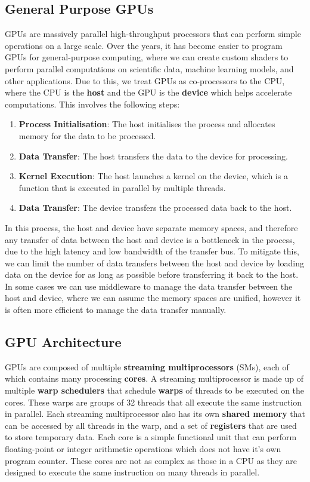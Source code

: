 \documentclass{article}
\begin{document}
\subsection{General Purpose GPUs}
GPUs are massively parallel high-throughput processors that can perform
simple operations on a large scale. Over the years, it has become
easier to program GPUs for general-purpose computing, where we can
create custom shaders to perform parallel computations on scientific
data, machine learning models, and other applications. Due to this, we
treat GPUs as co-processors to the CPU, where the CPU is the
\textbf{host} and the GPU is the \textbf{device} which helps accelerate
computations. This involves the following steps:
\begin{enumerate}
    \item \textbf{Process Initialisation}: The host initialises the
          process and allocates memory for the data to be processed.
    \item \textbf{Data Transfer}: The host transfers the data to the
          device for processing.
    \item \textbf{Kernel Execution}: The host launches a kernel on the
          device, which is a function that is executed in parallel by
          multiple threads.
    \item \textbf{Data Transfer}: The device transfers the processed
          data back to the host.
\end{enumerate}
In this process, the host and device have separate memory spaces, and
therefore any transfer of data between the host and device is a
bottleneck in the process, due to the high latency and low bandwidth of
the transfer bus. To mitigate this, we can limit the number of data
transfers between the host and device by loading data on the device for
as long as possible before transferring it back to the host. In some
cases we can use middleware to manage the data transfer between the host
and device, where we can assume the memory spaces are unified, however
it is often more efficient to manage the data transfer manually.
\subsection{GPU Architecture}
GPUs are composed of multiple \textbf{streaming multiprocessors} (SMs),
each of which contains many processing \textbf{cores}. A streaming
multiprocessor is made up of multiple \textbf{warp schedulers} that
schedule \textbf{warps} of threads to be executed on the cores. These
warps are groups of 32 threads that all execute the same instruction in
parallel. Each streaming multiprocessor also has its own \textbf{shared
memory} that can be accessed by all threads in the warp, and a set of
\textbf{registers} that are used to store temporary data. Each core is
a simple functional unit that can perform floating-point or integer
arithmetic operations which does not have it's own program counter.
These cores are not as complex as those in a CPU as they are designed
to execute the same instruction on many threads in parallel.
\end{document}
